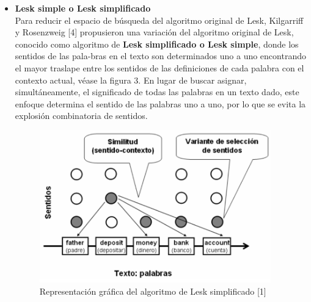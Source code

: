 \begin{itemize}
  \item \textbf{Lesk simple o Lesk simplificado} \\
    Para reducir el espacio de búsqueda del algoritmo original de Lesk, Kilgarriff y Rosenzweig [4] propusieron una variación del algoritmo original de Lesk, conocido como algoritmo de \textbf{Lesk simplificado o Lesk simple}, donde los sentidos de las pala-bras en el texto son determinados uno a uno encontrando el mayor traslape entre los sentidos de las definiciones de cada palabra con el contexto actual, véase la figura 3. En lugar de buscar asignar, simultáneamente, el significado de todas las palabras en un texto dado, este enfoque determina el sentido de las palabras uno a uno, por lo que se evita la explosión combinatoria de sentidos.
  
    \begin{figure}[h!]
      \begin{center}
      \includegraphics[angle=0, width=10cm]{Graficos/lesk_simple}
      \caption{Representación gráfica del algoritmo de Lesk simplificado [1]}
      \end{center}
    \end{figure}
    

\end{itemize}
